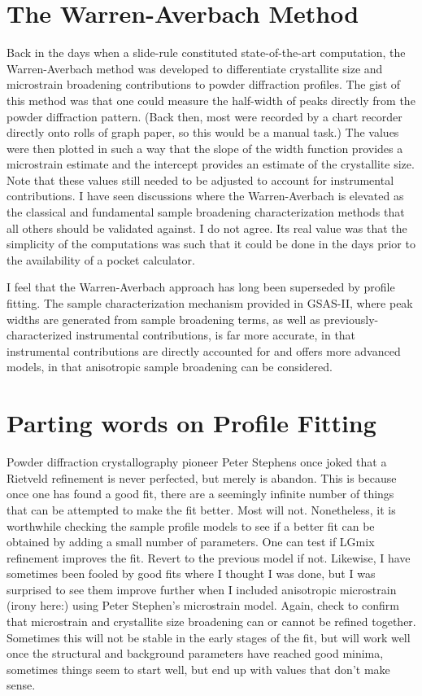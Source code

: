  

\section{The Warren-Averbach Method}

 Back in the days when a slide-rule constituted state-of-the-art computation, the Warren-Averbach method was developed to differentiate crystallite size and microstrain broadening contributions to powder diffraction profiles. The gist of this method was that one could measure the half-width of peaks directly from the powder diffraction pattern. (Back then, most were recorded by a chart recorder directly onto rolls of graph paper, so this would be a manual task.) The values were then plotted in such a way that the slope of the width function provides a microstrain estimate and the intercept provides an estimate of the crystallite size. Note that these values still needed to be adjusted to account for instrumental contributions. I have seen discussions where the Warren-Averbach is elevated as the classical and fundamental sample broadening characterization methods that all others should be validated against. I do not agree. Its real value was that the simplicity of the computations was such that it could be done in the days prior to the availability of a pocket calculator. 

 I feel that the Warren-Averbach approach has long been superseded by profile fitting. The sample characterization mechanism provided in GSAS-II, where peak widths are generated from sample broadening terms, as well as previously-characterized instrumental contributions, is far more accurate, in that instrumental contributions are directly accounted for and offers more advanced models, in that anisotropic sample broadening can be considered. 

 

\section{Parting words on Profile Fitting}

 Powder diffraction crystallography pioneer Peter Stephens once joked that a Rietveld refinement is never perfected, but merely is abandon. This is because once one has found a good fit, there are a seemingly infinite number of things that can be attempted to make the fit better. Most will not. Nonetheless, it is worthwhile checking the sample profile models to see if a better fit can be obtained by adding a small number of parameters. One can test if LGmix refinement improves the fit. Revert to the previous model if not. Likewise, I have sometimes been fooled by good fits where I thought I was done, but I was surprised to see them improve further when I included anisotropic microstrain (irony here:) using Peter Stephen’s microstrain model. Again, check to confirm that microstrain and crystallite size broadening can or cannot be refined together. Sometimes this will not be stable in the early stages of the fit, but will work well once the structural and background parameters have reached good minima, sometimes things seem to start well, but end up with values that don’t make sense. 
